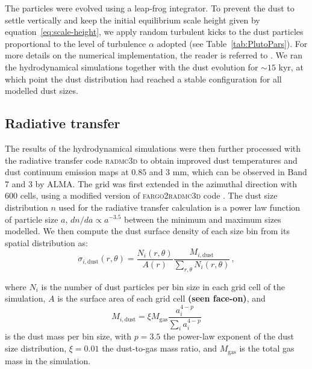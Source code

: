 \documentclass[fleqn,usenatbib]{mnras}
\begin{document}
        The particles were evolved using a leap-frog integrator.
        To prevent the dust to settle vertically and keep the initial equilibrium scale height given by equation~\ref{eq:scale-height}, we apply random turbulent kicks to the dust particles proportional to the level of turbulence $\alpha$ adopted (see Table~\ref{tab:PlutoPars}). For more details on the numerical implementation, the reader is referred to \cite{Picogna2018}. We ran the hydrodynamical simulations together with the dust evolution for $\sim15$ kyr, at which point the dust distribution had reached a stable configuration for all modelled dust sizes.
        
     \subsection{Radiative transfer} \label{sec:radiative transfer}
     
         The results of the hydrodynamical simulations were then further processed with the radiative transfer code \textsc{radmc3d} \citep{radmc3d} to obtain improved dust temperatures and dust continuum emission maps at $0.85$ and $3$ mm, which can be observed in Band 7 and 3 by ALMA. The grid was first extended in the azimuthal direction with 600 cells, using a modified version of \textsc{fargo2radmc3d} code \citep{Baruteau2019}. The dust size distribution $n$ used for the radiative transfer calculation is a power law function of particle size $a$, $dn/da \propto a^{-3.5}$ between the minimum and maximum sizes modelled. We then compute the dust surface density of each size bin from its spatial distribution as:
         \begin{equation}
            \sigma_{i,\mathrm{dust}}(r,\theta) = \frac{N_i(r,\theta)}{A(r)} \frac{M_{i,\mathrm{dust}}}{\sum_{r,\theta}N_i(r,\theta)}\,,
         \end{equation}

         where $N_i$ is the number of dust particles per bin size in each grid cell of the simulation, $A$ is the surface area of each grid cell \textbf{(seen face-on)}, and 
         \begin{equation}
            M_{i,\mathrm{dust}} = \xi M_\mathrm{gas} \frac{a_i^{4-p}}{\sum_i a_i^{4-p}}
         \end{equation}
         is the dust mass per bin size, with $p=3.5$ the power-law exponent of the dust size distribution, $\xi=0.01$ the dust-to-gas mass ratio, and $M_\mathrm{gas}$ is the total gas mass in the simulation.
\end{document}
